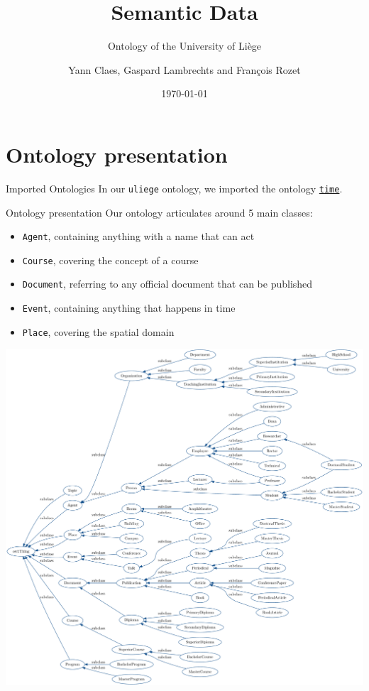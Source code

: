 \documentclass[12pt]{beamer}
\title{Semantic Data}
\subtitle{Ontology of the University of Liège}
\author{Yann Claes, Gaspard Lambrechts and François Rozet}
\institute{University of Liège}
\date{\today}
\begin{document}
\maketitle

\section{Ontology presentation}

\begin{frame}{Imported Ontologies}
    In our \texttt{uliege} ontology, we imported the ontology \href{https://www.w3.org/2006/time}{\texttt{time}}.
\end{frame}

\begin{frame}{Ontology presentation}
    Our ontology articulates around 5 main classes:
    \begin{itemize}
        \item \texttt{Agent}, containing anything with a \alert{name} that can \alert{act}
        \item \texttt{Course}, covering the concept of a \alert{course}
        \item \texttt{Document}, referring to any \alert{official} document that can be \alert{published}
        \item \texttt{Event}, containing anything that \alert{happens} in time
        \item \texttt{Place}, covering the \alert{spatial} domain
    \end{itemize}
\end{frame}

\begin{frame}
    \includegraphics[height=.99\paperheight]{resources/pdf/class_hierarchy.pdf}
\end{frame}
\end{document}
